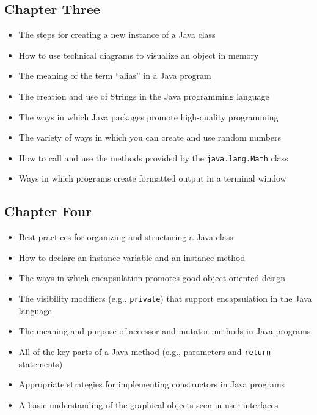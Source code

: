 \documentclass[11pt]{article}
\begin{document}
\subsection*{Chapter Three}

\begin{itemize}

  \item The steps for creating a new instance of a Java class
  \item How to use technical diagrams to visualize an object in memory
  \item The meaning of the term ``alias'' in a Java program
  \item The creation and use of Strings in the Java programming language
  \item The ways in which Java packages promote high-quality programming
  \item The variety of ways in which you can create and use random numbers
  \item How to call and use the methods provided by the {\tt java.lang.Math} class
  \item Ways in which programs create formatted output in a terminal window

\end{itemize}

\subsection*{Chapter Four}

\begin{itemize}

  \item Best practices for organizing and structuring a Java class
  \item How to declare an instance variable and an instance method
  \item The ways in which encapsulation promotes good object-oriented design
  \item The visibility modifiers (e.g., {\tt private}) that support encapsulation in the Java language
  \item The meaning and purpose of accessor and mutator methods in Java programs
  \item All of the key parts of a Java method (e.g., parameters and {\tt return} statements)
  \item Appropriate strategies for implementing constructors in Java programs
  \item A basic understanding of the graphical objects seen in user interfaces

\end{itemize}
\end{document}
